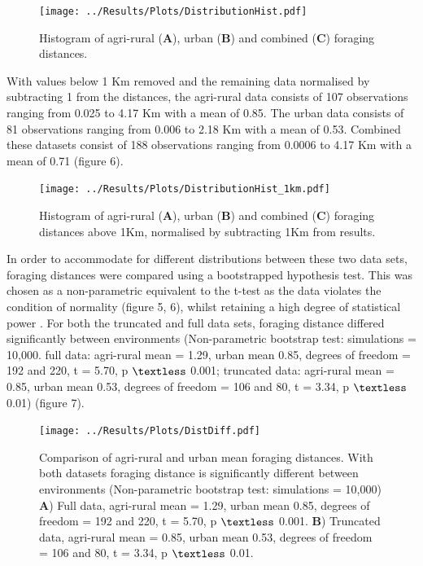 \documentclass[11pt,usenames,dvipsnames,a4paper]{article}
\begin{document}
\begin{figure}[H]
	\centering
	\texttt{[image: ../Results/Plots/DistributionHist.pdf]}
	\caption{Histogram of agri-rural (\textbf{A}), urban (\textbf{B}) and combined (\textbf{C}) foraging distances.}
\end{figure}
\begin{linenumbers}

With values below 1 Km removed and the remaining data normalised by subtracting 1 from the distances, the agri-rural data consists of 107 observations ranging from 0.025 to 4.17 Km with a mean of 0.85. The urban data consists of 81 observations ranging from 0.006 to 2.18 Km with a mean of 0.53. Combined these datasets consist of 188 observations ranging from 0.0006 to 4.17 Km with a mean of 0.71 (figure 6).
\end{linenumbers}
\begin{figure}[H]
	\centering
	\texttt{[image: ../Results/Plots/DistributionHist\_1km.pdf]}
	\caption{Histogram of agri-rural (\textbf{A}), urban (\textbf{B}) and combined (\textbf{C}) foraging distances above 1Km, normalised by subtracting 1Km from results.}
\end{figure}
\begin{linenumbers}

In order to accommodate for different distributions between these two data sets, foraging distances were compared using a bootstrapped hypothesis test. This was chosen as a non-parametric equivalent to the t-test as the data violates the condition of normality (figure 5, 6), whilst retaining a high degree of statistical power \citep{Johnson2001}. For both the truncated and full data sets, foraging distance differed significantly between environments (Non-parametric bootstrap test: simulations = 10,000. full data: agri-rural mean = 1.29, urban mean 0.85, degrees of freedom = 192 and 220, t = 5.70, p $\textless$ 0.001; truncated data: agri-rural mean = 0.85, urban mean 0.53, degrees of freedom = 106 and 80, t = 3.34, p $\textless$ 0.01) (figure 7). 
\end{linenumbers}
\begin{figure}[H]
	\centering
	\texttt{[image: ../Results/Plots/DistDiff.pdf]}
	\caption{Comparison of agri-rural and urban mean foraging distances. With both datasets foraging distance is significantly different between environments (Non-parametric bootstrap test: simulations = 10,000) \textbf{A}) Full data, agri-rural mean = 1.29, urban mean 0.85, degrees of freedom = 192 and 220, t = 5.70, p $\textless$ 0.001. \textbf{B}) Truncated data, agri-rural mean = 0.85, urban mean 0.53, degrees of freedom = 106 and 80, t = 3.34, p $\textless$ 0.01.}
\end{figure}
\end{document}
